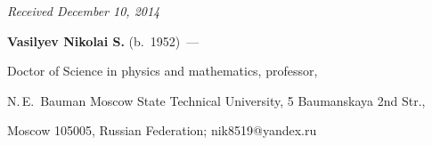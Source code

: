 \vspace*{-3pt}



\hfill{\small\textit{Received December 10, 2014}}








     \Contrl



     \noindent

     \textbf{Vasilyev Nikolai S.} (b.\ 1952)~---

      Doctor of Science in physics and mathematics, professor,

N.\,E.~Bauman Moscow State Technical University, 5 Baumanskaya 2nd Str.,

Moscow 105005, Russian Federation; nik8519@yandex.ru



\label{end\stat}





\renewcommand{\bibname}{\protect\rm Литература}

